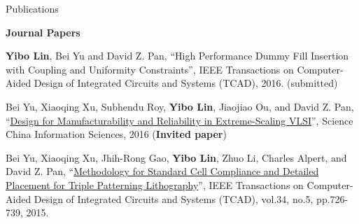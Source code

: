 \begin{rSection}{Publications}

\textbf{Journal Papers}
\begin{description}[font=\normalfont]
\item[{[J3]}]{
        \textbf{Yibo Lin}, Bei Yu and David Z. Pan, 
    ``High Performance Dummy Fill Insertion with Coupling and Uniformity Constraints'', 
    IEEE Transactions on Computer-Aided Design of Integrated Circuits and Systems (TCAD), 2016.
    (submitted)
}
\item[{[J2]}]{
        Bei Yu, Xiaoqing Xu, Subhendu Roy, \textbf{Yibo Lin}, Jiaojiao Ou, and David Z. Pan, 
        ``\href{http://link.springer.com/article/10.1007%2Fs11432-016-5560-6}{Design for Manufacturability and Reliability in Extreme-Scaling VLSI}'', 
        Science China Information Sciences, 2016 
        (\textbf{Invited paper})
}
\item[{[J1]}]{
        Bei Yu, Xiaoqing Xu, Jhih-Rong Gao, \textbf{Yibo Lin}, Zhuo Li, Charles Alpert, and David Z. Pan, 
        ``\href{http://ieeexplore.ieee.org/xpl/articleDetails.jsp?tp=&arnumber=7036058}{Methodology for Standard Cell Compliance and Detailed Placement for Triple Patterning Lithography}'', 
        IEEE Transactions on Computer-Aided Design of Integrated Circuits and Systems (TCAD), vol.34, no.5, pp.726-739, 2015. 
}
\end{description}



\end{rSection}
